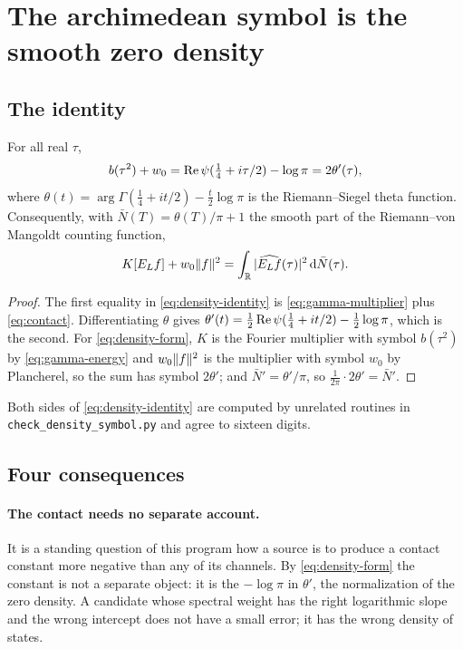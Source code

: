 \section{The archimedean symbol is the smooth zero density}\label{sec:density}
\subsection{The identity}
\begin{proposition}\label{prop:density}
For all real $\tau$,
\begin{equation}\label{eq:density-identity}
 b(\tau^2)+w_0=\operatorname{Re}\psi(\tfrac14+i\tau/2)-\log\pi=2\theta'(\tau),
\end{equation}
where $\theta(t)=\arg\Gamma(\tfrac14+it/2)-\tfrac t2\log\pi$ is the
Riemann--Siegel theta function. Consequently, with
$\bar N(T)=\theta(T)/\pi+1$ the smooth part of the Riemann--von Mangoldt
counting function,
\begin{equation}\label{eq:density-form}
 K[E_Lf]+w_0\lVert f\rVert^2=\int_\mathbb R|\widehat{E_Lf}(\tau)|^2\,\mathrm d\bar N(\tau).
\end{equation}
\end{proposition}
\begin{proof}
The first equality in \eqref{eq:density-identity} is \eqref{eq:gamma-multiplier}
plus \eqref{eq:contact}. Differentiating $\theta$ gives
$\theta'(t)=\tfrac12\operatorname{Re}\psi(\tfrac14+it/2)-\tfrac12\log\pi$, which is the second.
For \eqref{eq:density-form}, $K$ is the Fourier multiplier with symbol
$b(\tau^2)$ by \eqref{eq:gamma-energy} and $w_0\lVert f\rVert^2$ is the multiplier with
symbol $w_0$ by Plancherel, so the sum has symbol $2\theta'$; and
$\bar N'=\theta'/\pi$, so $\tfrac1{2\pi}\cdot2\theta'=\bar N'$.
\end{proof}

Both sides of \eqref{eq:density-identity} are computed by unrelated routines in
\texttt{check\_density\_symbol.py} and agree to sixteen digits.

\subsection{Four consequences}
\paragraph{The contact needs no separate account.}
It is a standing question of this program how a source is to produce a contact
constant more negative than any of its channels. By \eqref{eq:density-form} the
constant is not a separate object: it is the $-\log\pi$ in $\theta'$, the
normalization of the zero density. A candidate whose spectral weight has the
right logarithmic slope and the wrong intercept does not have a small error; it
has the wrong density of states.

